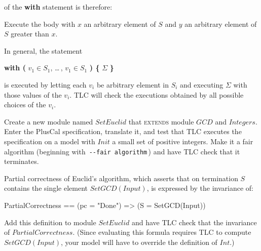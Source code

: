 \documentclass[fleqn,leqno]{article}
\begin{document}
of the 
\textbf{with} statement is therefore:
\begin{display}
Execute the body with $x$ an arbitrary element of $S$ and $y$ an
arbitrary element of $S$ greater than $x$.
\end{display}
In general, the statement
\begin{display}
\textbf{with (} $v_{1} \in S_{1}$, \ldots\,, $v_{1} \in S_{1}$ \textbf{) \{}
 $\Sigma$ \textbf{\}}%
\end{display}
is executed by letting each $v_{i}$ be arbitrary element in $S_{i}$
and executing $\Sigma$ with those values of the $v_{i}$.  TLC will check
the executions obtained by all possible choices of the $v_{i}$.

Create a new module named $SetEuclid$ that \textsc{extends} module
$GCD$ and $Integers$.  Enter the PlusCal specification, translate it,
and test that TLC executes the specification on a model with $Init$ a
small set of positive integers.  Make it a fair algorithm (beginning
with \,\texttt{-{}-fair algorithm}\,) and have TLC check that it terminates.

Partial correctness of Euclid's algorithm, which asserts that 
on termination $S$ contains the single element $SetGCD(Input)$, 
is expressed by the invariance of:
\begin{display}
\begin{notla}
PartialCorrectness == (pc = "Done") => (S = {SetGCD(Input)})
\end{notla}
\begin{tlatex}
\end{tlatex}
\end{display}
Add this definition to module $SetEuclid$ and have TLC check that the
invariance of $PartialCorrectness$.  (Since evaluating this formula
requires TLC to compute $SetGCD(Input)$, your model will have to
override the definition of $Int$.)
\end{document}
